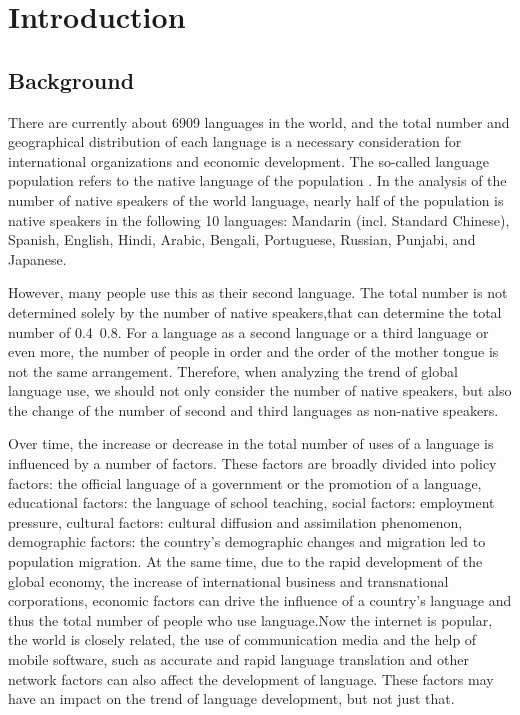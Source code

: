 \section{Introduction}

\subsection{Background}
\noindent
There are currently about 6909 languages in the world, and the total number and geographical distribution of each language is a necessary consideration for international organizations and economic development. The so-called language population refers to the native language of the population . In the analysis of the number of native speakers of the world language, nearly half of the population is native speakers in the following 10 languages: Mandarin (incl. Standard Chinese), Spanish, English, Hindi, Arabic, Bengali, Portuguese, Russian, Punjabi, and Japanese.

However, many people use this as their second language. The total number is not determined solely by the number of native speakers,that can determine the total number of 0.4~0.8. For a language as a second language or a third language or even more, the number of people in order and the order of the mother tongue is not the same arrangement. Therefore, when analyzing the trend of global language use, we should not only consider the number of native speakers, but also the change of the number of  second and third languages as non-native speakers. 

Over time, the increase or decrease in the total number of uses of a language is influenced by a number of factors. These factors are broadly divided into policy factors: the official language of a government or the promotion of a language, educational factors: the language of school teaching, social factors: employment pressure, cultural factors: cultural diffusion and assimilation phenomenon, demographic factors: the country's demographic changes and migration led to population migration. At the same time, due to the rapid development of the global economy, the increase of international business and transnational corporations, economic factors can drive the influence of a country's language and thus the total number of people who use language.Now the internet is popular, the world is closely related, the use of communication media and the help of mobile software, such as accurate and rapid language translation and other network factors can also affect the development of language. These factors may have an impact on the trend of language development, but not just that. 
